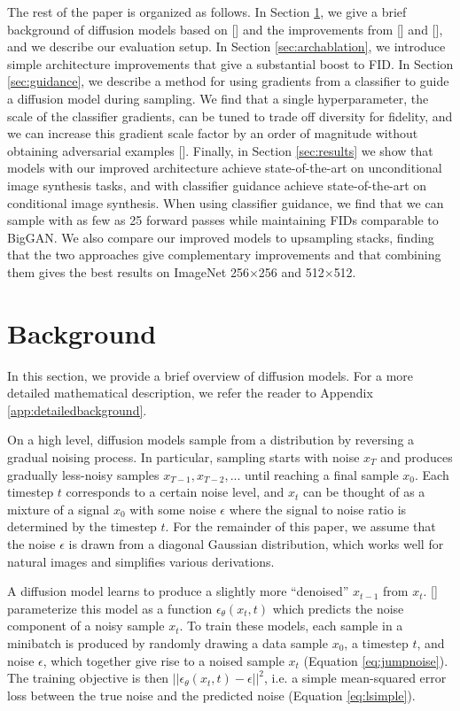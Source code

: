 The rest of the paper is organized as follows. In Section \ref{sec:background}, we give a brief background of diffusion models based on \citeauthor{ddpm} [] and the improvements from \citeauthor{improved} [] and \citeauthor{ddim} [], and we describe our evaluation setup. In Section \ref{sec:archablation}, we introduce simple architecture improvements that give a substantial boost to FID. In Section \ref{sec:guidance}, we describe a method for using gradients from a classifier to guide a diffusion model during sampling. We find that a single hyperparameter, the scale of the classifier gradients, can be tuned to trade off diversity for fidelity, and we can increase this gradient scale factor by an order of magnitude without obtaining adversarial examples [].
Finally, in Section \ref{sec:results} we show that models with our improved architecture achieve state-of-the-art on unconditional image synthesis tasks, and with classifier guidance achieve state-of-the-art on conditional image synthesis. When using classifier guidance, we find that we can sample with as few as 25 forward passes while maintaining FIDs comparable to BigGAN. We also compare our improved models to upsampling stacks, finding that the two approaches give complementary improvements and that combining them gives the best results on ImageNet 256$\times$256 and 512$\times$512.

\section{Background}
\label{sec:background}
In this section, we provide a brief overview of diffusion models. For a more detailed mathematical description, we refer the reader to Appendix \ref{app:detailedbackground}.

On a high level, diffusion models sample from a distribution by reversing a gradual noising process. In particular, sampling starts with noise $x_T$ and produces gradually less-noisy samples $x_{T-1},x_{T-2},...$ until reaching a final sample $x_0$. Each timestep $t$ corresponds to a certain noise level, and $x_t$ can be thought of as a mixture of a signal $x_0$ with some noise $\epsilon$ where the signal to noise ratio is determined by the timestep $t$. For the remainder of this paper, we assume that the noise $\epsilon$ is drawn from a diagonal Gaussian distribution, which works well for natural images and simplifies various derivations.

A diffusion model learns to produce a slightly more ``denoised'' $x_{t-1}$ from $x_{t}$. \citeauthor{ddpm} [] parameterize this model as a function $\epsilon_{\theta}(x_t,t)$ which predicts the noise component of a noisy sample $x_t$. To train these models, each sample in a minibatch is produced by randomly drawing a data sample $x_0$, a timestep $t$, and noise $\epsilon$, which together give rise to a noised sample $x_t$ (Equation \ref{eq:jumpnoise}). 
The training objective is then $||\epsilon_{\theta}(x_t,t) - \epsilon||^2$, i.e. a simple mean-squared error loss between the true noise and the predicted noise (Equation \ref{eq:lsimple}). 

